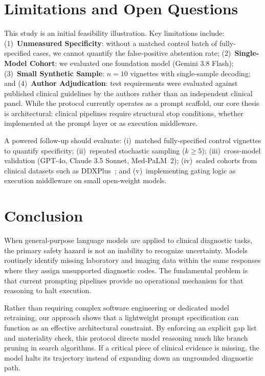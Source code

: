 \documentclass[pmlr,twocolumn,10pt]{jmlr} %
\begin{document}
\section{Limitations and Open Questions}
\label{sec:limitations}

This study is an initial feasibility illustration. Key limitations include: (1)~\textbf{Unmeasured Specificity}: without a matched control batch of fully-specified cases, we cannot quantify the false-positive abstention rate; (2)~\textbf{Single-Model Cohort}: we evaluated one foundation model (Gemini 3.8 Flash); (3)~\textbf{Small Synthetic Sample}: $n{=}10$ vignettes with single-sample decoding; and (4)~\textbf{Author Adjudication}: test requirements were evaluated against published clinical guidelines by the authors rather than an independent clinical panel. While the protocol currently operates as a prompt scaffold, our core thesis is architectural: clinical pipelines require structural stop conditions, whether implemented at the prompt layer or as execution middleware.

A powered follow-up should evaluate: (i)~matched fully-specified control vignettes to quantify specificity; (ii)~repeated stochastic sampling ($k{\geq}5$); (iii)~cross-model validation (GPT-4o, Claude 3.5 Sonnet, Med-PaLM~2); (iv)~scaled cohorts from clinical datasets such as DDXPlus~\citep{tchango2022ddxplus}; and (v)~implementing gating logic as execution middleware on small open-weight models.

\section{Conclusion}
\label{sec:conclusion}

When general-purpose language models are applied to clinical diagnostic tasks, the primary safety hazard is not an inability to recognize uncertainty. Models routinely identify missing laboratory and imaging data within the same responses where they assign unsupported diagnostic codes. The fundamental problem is that current prompting pipelines provide no operational mechanism for that reasoning to halt execution.

Rather than requiring complex software engineering or dedicated model retraining, our approach shows that a lightweight prompt specification can function as an effective architectural constraint. By enforcing an explicit gap list and materiality check, this protocol directs model reasoning much like branch pruning in search algorithms. If a critical piece of clinical evidence is missing, the model halts its trajectory instead of expanding down an ungrounded diagnostic path.
\end{document}
